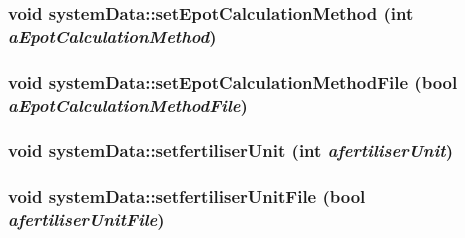 \label{classsystem_data_ad1a2ccae8bebbee4f696b67425d52ef6}
\hypertarget{classsystem_data_afb8e5409ccb3d2e518ccba7eec53d111}{
\subsubsection[{setEpotCalculationMethod}]{\setlength{\rightskip}{0pt plus 5cm}void systemData::setEpotCalculationMethod (int {\em aEpotCalculationMethod})}}
\label{classsystem_data_afb8e5409ccb3d2e518ccba7eec53d111}
\hypertarget{classsystem_data_a15b9e3568b9d58341b9c9ae1e536d555}{
\subsubsection[{setEpotCalculationMethodFile}]{\setlength{\rightskip}{0pt plus 5cm}void systemData::setEpotCalculationMethodFile (bool {\em aEpotCalculationMethodFile})}}
\label{classsystem_data_a15b9e3568b9d58341b9c9ae1e536d555}
\hypertarget{classsystem_data_a20da87a9187447b0ecdb33dbb4176ef0}{
\subsubsection[{setfertiliserUnit}]{\setlength{\rightskip}{0pt plus 5cm}void systemData::setfertiliserUnit (int {\em afertiliserUnit})}}
\label{classsystem_data_a20da87a9187447b0ecdb33dbb4176ef0}
\hypertarget{classsystem_data_a1ae32115c7a6a82767642d0ef891ed7d}{
\subsubsection[{setfertiliserUnitFile}]{\setlength{\rightskip}{0pt plus 5cm}void systemData::setfertiliserUnitFile (bool {\em afertiliserUnitFile})}}
